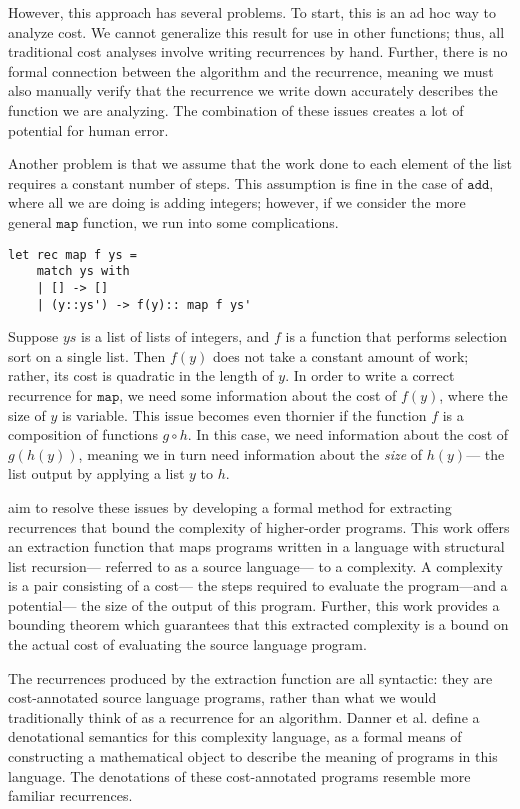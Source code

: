 However, this approach has several problems. To start, this is an ad hoc way to analyze cost. We cannot generalize
this result for use in other functions; thus, all traditional cost analyses involve writing recurrences by hand. Further, there is 
no formal connection between the algorithm and the recurrence, meaning we must also manually verify that the recurrence
we write down accurately describes the function we are analyzing. The combination of these issues creates a lot of potential
for human error.

Another problem is that we assume that the work done to each element of the list requires a constant number of steps. 
This assumption is fine in the case of $\texttt{add}$, where all we are doing is adding integers; however, if we consider
the more general $\texttt{map}$ function, we run into some complications. 
\begin{verbatim}
let rec map f ys =
	match ys with
	| [] -> []
	| (y::ys') -> f(y):: map f ys'
\end{verbatim}
Suppose $ys$ is a list of lists of integers, and $f$ is a function that performs selection sort on a single list. Then $f(y)$ does
not take a constant amount of work; rather, its cost is quadratic in the length of $y$. In order to write a correct recurrence
for $\texttt{map}$, we need some information about the cost of $f(y)$, where the size of $y$ is variable. This issue
becomes even thornier if the function $f$ is a composition of functions $g \circ h$. In this case, we need information about the cost of $g(h(y))$, meaning we in turn need information about the \emph{size} of $h(y)$--- the list output by applying a list $y$ to $h$. 

\cite{N.-Danner:2015aa} aim to resolve these issues by developing a formal method for extracting
recurrences that bound the complexity of higher-order programs. This work offers an extraction function that maps 
programs written in a language with structural list recursion--- referred to as a source language--- to a complexity. A 
complexity is a pair consisting of a cost--- the steps required to evaluate the program---and a potential--- the size of the 
output of this program. Further, this work provides a bounding theorem which guarantees that this extracted complexity is 
a bound on the actual cost of evaluating the source language program. 

The recurrences produced by the extraction function are all syntactic: they are cost-annotated source language
programs, rather than what we would traditionally think of as a recurrence for an algorithm. Danner et al. define a 
denotational semantics for this complexity language, as a formal means of constructing a mathematical object to
describe the meaning of programs in this language. The denotations of these cost-annotated programs resemble
more familiar recurrences.

